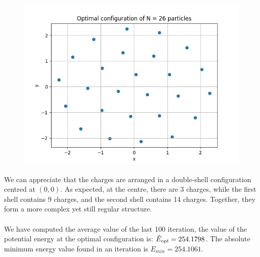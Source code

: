 \documentclass{article}
\begin{document}
\begin{figure}[H]
    \centering
    \includegraphics[width=\linewidth]{images/Figure2.N26.png}
    \caption{}
    \label{fig:Figure2.N26.png}
\end{figure}
\noindent We can  appreciate that the charges are arranged in a double-shell configuration centred at $(0,0)$. As expected, at the centre, there are 3 charges, while the first shell contains 9 charges, and the second shell contains 14 charges. Together, they form a more complex yet still regular structure.\\\\We have computed the average value of the last 100 iteration, the value of the potential energy at the optimal configuration is: $\Tilde{E}_{opt}=254.1798$. The absolute minimum energy value found in an iteration is $E_{min}=254.1061$.
\clearpage
\end{document}

